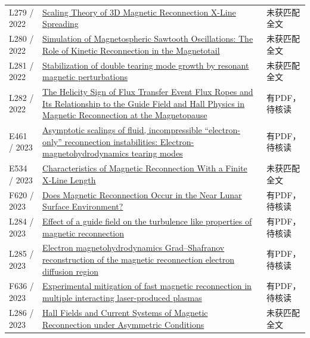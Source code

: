 \documentclass[UTF8,a4paper,11pt,openany,fontset=fandol]{ctexbook}
\begin{document}
\begin{longtable}{P{24mm}P{97mm}P{27mm}}
L279 / 2022 & \href{https://doi.org/10.33915/etd.11608}{Scaling Theory of 3D Magnetic Reconnection X-Line Spreading} & 未获匹配全文\\

L280 / 2022 & \href{https://doi.org/10.1029/2022gl099638}{Simulation of Magnetospheric Sawtooth Oscillations: The Role of Kinetic Reconnection in the Magnetotail} & 未获匹配全文\\

L281 / 2022 & \href{https://doi.org/10.1088/1741-4326/ac8f59}{Stabilization of double tearing mode growth by resonant magnetic perturbations} & 未获匹配全文\\

L282 / 2022 & \href{https://doi.org/10.1029/2022ja030686}{The Helicity Sign of Flux Transfer Event Flux Ropes and Its Relationship to the Guide Field and Hall Physics in Magnetic Reconnection at the Magnetopause} & 有PDF，待核读\\

E461 / 2023 & \href{https://doi.org/10.1063/5.0155211}{Asymptotic scalings of fluid,  incompressible “electron-only” reconnection instabilities: Electron-magnetohydrodynamics tearing modes} & 有PDF，待核读\\

E534 / 2023 & \href{https://doi.org/10.1029/2022ja031209}{Characteristics of Magnetic Reconnection With a Finite X‐Line Length} & 未获匹配全文\\

F620 / 2023 & \href{https://doi.org/10.1029/2023gl104733}{Does Magnetic Reconnection Occur in the Near Lunar Surface Environment?} & 有PDF，待核读\\

L284 / 2023 & \href{https://doi.org/10.1063/5.0150929}{Effect of a guide field on the turbulence like properties of magnetic reconnection} & 有PDF，待核读\\

L285 / 2023 & \href{https://doi.org/10.3389/fspas.2023.1069888}{Electron magnetohydrodynamics Grad–Shafranov reconstruction of the magnetic reconnection electron diffusion region} & 有PDF，待核读\\

F636 / 2023 & \href{https://doi.org/10.48550/arxiv.2305.05701}{Experimental mitigation of fast magnetic reconnection in multiple interacting laser-produced plasmas} & 有PDF，待核读\\

L286 / 2023 & \href{https://doi.org/10.3847/1538-4357/aca760}{Hall Fields and Current Systems of Magnetic Reconnection under Asymmetric Conditions} & 未获匹配全文\\


\end{longtable}
\end{document}
